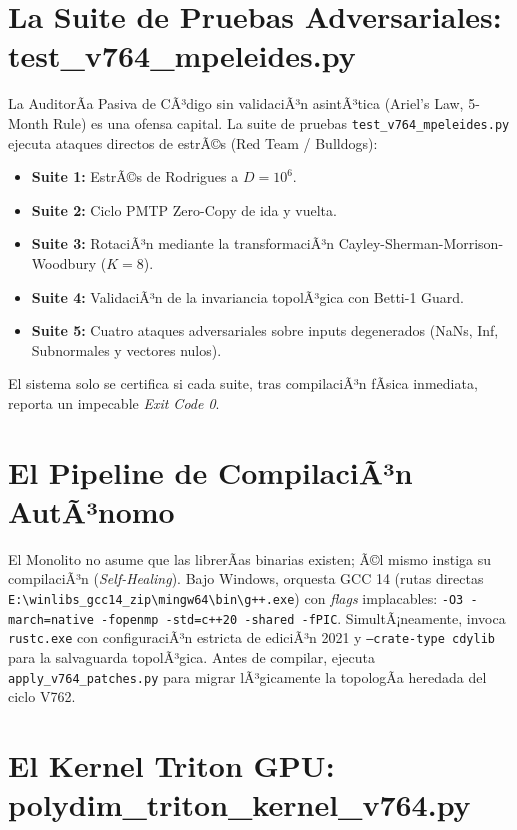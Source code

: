 \section{La Suite de Pruebas Adversariales: test\_v764\_mpeleides.py}
\label{sec:test_suite}

La AuditorÃ­a Pasiva de CÃ³digo sin validaciÃ³n asintÃ³tica (Ariel's Law, 5-Month Rule) es una ofensa capital. La suite de pruebas \texttt{test\_v764\_mpeleides.py} ejecuta ataques directos de estrÃ©s (Red Team / Bulldogs):
\begin{itemize}
    \item \textbf{Suite 1:} EstrÃ©s de Rodrigues a \(D=10^6\).
    \item \textbf{Suite 2:} Ciclo PMTP Zero-Copy de ida y vuelta.
    \item \textbf{Suite 3:} RotaciÃ³n mediante la transformaciÃ³n Cayley-Sherman-Morrison-Woodbury (\(K=8\)).
    \item \textbf{Suite 4:} ValidaciÃ³n de la invariancia topolÃ³gica con Betti-1 Guard.
    \item \textbf{Suite 5:} Cuatro ataques adversariales sobre inputs degenerados (NaNs, Inf, Subnormales y vectores nulos).
\end{itemize}
El sistema solo se certifica si cada suite, tras compilaciÃ³n fÃ­sica inmediata, reporta un impecable \textit{Exit Code 0}.

\section{El Pipeline de CompilaciÃ³n AutÃ³nomo}
\label{sec:build_pipeline}

El Monolito no asume que las librerÃ­as binarias existen; Ã©l mismo instiga su compilaciÃ³n (\textit{Self-Healing}).
Bajo Windows, orquesta GCC 14 (rutas directas \texttt{E:\textbackslash winlibs\_gcc14\_zip\textbackslash mingw64\textbackslash bin\textbackslash g++.exe}) con \textit{flags} implacables: \texttt{-O3 -march=native -fopenmp -std=c++20 -shared -fPIC}.
SimultÃ¡neamente, invoca \texttt{rustc.exe} con configuraciÃ³n estricta de ediciÃ³n 2021 y \texttt{--crate-type cdylib} para la salvaguarda topolÃ³gica. Antes de compilar, ejecuta \texttt{apply\_v764\_patches.py} para migrar lÃ³gicamente la topologÃ­a heredada del ciclo V762.

\section{El Kernel Triton GPU: polydim\_triton\_kernel\_v764.py}
\label{sec:triton_kernel}

